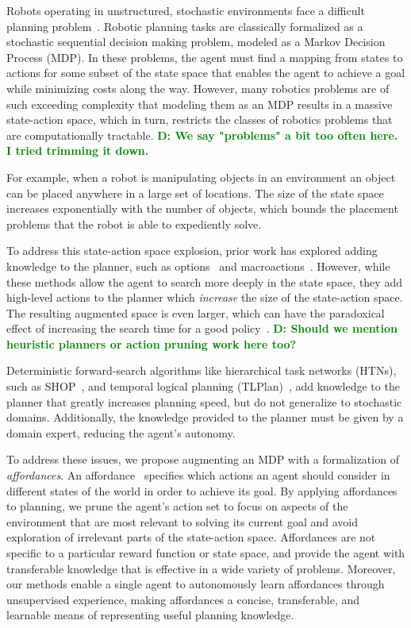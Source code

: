 \documentclass[conference]{IEEEtran}
\newcommand{\dnote}[1]{\textcolor{Green}{\textbf{D: #1}}}
\begin{document}
Robots operating in unstructured, stochastic environments face
a difficult planning problem~\citep{bollini12,knepper13}.
Robotic planning tasks are classically formalized as a stochastic sequential
decision making problem, modeled as a Markov Decision Process (MDP). In these problems,
the agent must find a mapping from states to actions for some subset of the 
state space that enables the agent to achieve a goal while minimizing costs 
along the way. However, many robotics problems are of such exceeding 
complexity that modeling them as an MDP results in a massive state-action space, 
which in turn, restricts the classes of robotics problems that are computationally tractable.
 \dnote{We say "problems" a bit too often here. I tried trimming it down.}
 
For example, when a robot is manipulating objects in an environment
an object can be placed anywhere in a large set of locations. The size
of the state space increases exponentially with the number of objects,
which bounds the placement problems that the robot is able to expediently solve.

To address this state-action space explosion, prior work has explored adding knowledge to the planner,
such as options~\cite{sutton99} and macroactions~\cite{Botea:2005kx,Newton:2005vn}. 
However, while these methods allow the agent to search more deeply in the state
space, they add high-level actions to the planner which {\em increase} the size of the state-action space.
The resulting augmented space is even larger, which can have the paradoxical 
effect of increasing the search time for a good policy~\cite{Jong:2008zr}.
\dnote{Should we mention heuristic planners or action pruning work here too?}

Deterministic forward-search algorithms like hierarchical task networks (HTNs),
such as SHOP~\citep{Nau:1999:SSH:1624312.1624357}, and
temporal logical planning (TLPlan)~\citep{Bacchus95usingtemporal,Bacchus99usingtemporal}, 
add knowledge to the planner that greatly increases planning speed, but do not
generalize to stochastic domains. Additionally, the knowledge provided to the 
planner must be given by a domain expert, reducing the agent's autonomy.

To address these issues, we propose augmenting an MDP
with a formalization of {\em affordances}. An
affordance~\cite{gibson77} specifies which actions an agent should consider in
different states of the world in order to achieve its goal. By applying affordances 
to planning, we prune the agent's action set to focus on aspects of the environment
that are most relevant to solving its current goal and avoid exploration of irrelevant 
parts of the state-action space. Affordances are not specific to a particular reward
function or state space, and provide the agent with transferable knowledge that is 
effective in a wide variety of problems. Moreover, our methods enable a single agent 
to autonomously learn affordances through unsupervised experience, making affordances 
a concise, transferable, and learnable means of representing useful planning knowledge.
\end{document}
